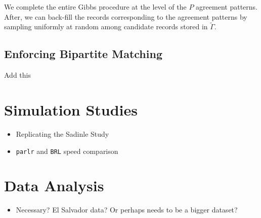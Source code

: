 \documentclass[
  12pt,
]{article}
\providecommand{\tightlist}{%
  \setlength{\itemsep}{0pt}\setlength{\parskip}{0pt}}
\begin{document}
We complete the entire Gibbs procedure at the level of the \(P\)
agreement patterns. After, we can back-fill the records corresponding to
the agreement patterns by sampling uniformly at random among candidate
records stored in \(\tilde{\Gamma}\).

\hypertarget{enforcing-bipartite-matching}{%
\subsection{Enforcing Bipartite
Matching}\label{enforcing-bipartite-matching}}

Add this

\hypertarget{simulation-studies}{%
\section{Simulation Studies}\label{simulation-studies}}

\begin{itemize}
\item
  Replicating the Sadinle Study
\item
  \texttt{parlr} and \texttt{BRL} speed comparison
\end{itemize}

\hypertarget{data-analysis}{%
\section{Data Analysis}\label{data-analysis}}

\begin{itemize}
\tightlist
\item
  Necessary? El Salvador data? Or perhaps needs to be a bigger dataset?
\end{itemize}
\end{document}
